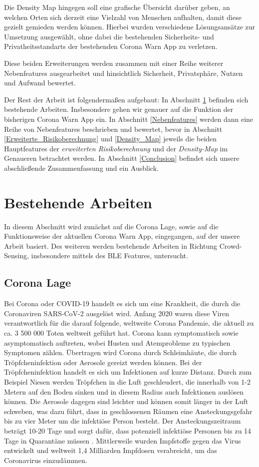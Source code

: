 \documentclass[conference,compsoc]{IEEEtran}
\begin{document}
Die Density Map hingegen soll eine grafische Übersicht darüber geben, an welchen Orten sich derzeit eine Vielzahl von Menschen aufhalten, damit diese gezielt gemieden werden können. 
Hierbei wurden verschiedene Lösungsansätze zur Umsetzung ausgewählt, ohne dabei die bestehenden Sicherheits- und Privatheitsstandarts der bestehenden Corona Warn App zu verletzen. 

Diese beiden Erweiterungen werden zusammen mit einer Reihe weiterer Nebenfeatures ausgearbeitet und hinsichtlich Sicherheit, Privatsphäre, Nutzen und Aufwand bewertet. 

Der Rest der Arbeit ist folgendermaßen aufgebaut: In Abschnitt \ref{rel_work} befinden sich bestehende Arbeiten. 
Insbesondere gehen wir genauer auf die Funktion der bisherigen Corona Warn App ein. 
In Abschnitt \ref{Nebenfeatures} werden dann eine Reihe von Nebenfeatures beschrieben und bewertet,
bevor in Abschnitt \ref{Erweiterte_Risikoberechnung} und \ref{Density_Map} jeweils die beiden Hauptfeatures der \textit{erweiterten Risikoberechnung} und der \textit{Density-Map} im Genaueren betrachtet werden. 
In Abschnitt \ref{Conclusion} befindet sich unsere abschließende Zusammenfassung und ein Ausblick. 

\section{Bestehende Arbeiten} \label{rel_work}

In diesem Abschnitt wird zunächst auf die Corona Lage, sowie auf die Funktionsweise der aktuellen Corona Warn App, eingegangen, auf der unsere Arbeit basiert. 
Des weiteren werden  bestehende Arbeiten in Richtung Crowd-Sensing, insbesondere mittels des BLE Features, untersucht. 
\subsection{Corona Lage}
Bei Corona oder COVID-19 handelt es sich um eine Krankheit, die durch die Coronaviren SARS-CoV-2 ausgelöst wird. 
Anfang 2020 waren diese Viren verantwortlich für die darauf folgende, weltweite Corona Pandemie, die aktuell zu ca. 3 500 000 Toten \cite{CoronaZahlenWorld} weltweit geführt hat. 
Corona kann symptomatisch sowie asymptomatisch auftreten, wobei Husten und Atemprobleme zu typischen Symptomen zählen.
Übertragen wird Corona durch Schleimhäute, die durch Tröpfcheninfektion oder Aerosole gereizt werden können.
Bei der Tröpfcheninfektion handelt es sich um Infektionen auf kurze Distanz. Durch zum Beispiel Niesen werden Tröpfchen in die Luft geschleudert, die innerhalb von 1-2 Metern auf den Boden sinken und in diesem Radius auch Infektionen auslösen können. 
Die Aerosole dagegen sind leichter und können somit länger in der Luft schweben, 
was dazu führt, dass in geschlossenen Räumen eine Ansteckungsgefahr bis zu vier Meter um die infektiöse Person besteht. 
Der Ansteckungszeitraum beträgt 10-20 Tage und sorgt dafür, dass potenziell infektiöse Personen bis zu 14 Tage in Quarantäne müssen \cite{Ubertragungswege}.
Mittlerweile wurden Impfstoffe gegen das Virus entwickelt und weltweit 1,4 Milliarden Impfdosen verabreicht, um das Coronavirus einzudämmen.
\end{document}
